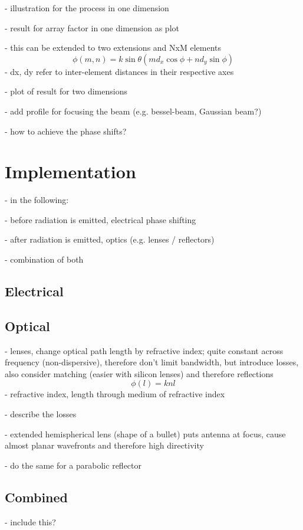 \documentclass[]{report}
\begin{document}
- illustration for the process in one dimension

- result for array factor in one dimension as plot

- this can be extended to two extensions and NxM elements
\begin{equation}
	\phi(m,n) = k\sin\theta(md_x\cos\phi + nd_y\sin\phi)
\end{equation}
- dx, dy refer to inter-element distances in their respective axes

- plot of result for two dimensions

- add profile for focusing the beam (e.g. bessel-beam, Gaussian beam?)

- how to achieve the phase shifts?

\section{Implementation}

- in the following:

- before radiation is emitted, electrical phase shifting

- after radiation is emitted, optics (e.g. lenses / reflectors)

- combination of both

\subsection{Electrical}

\subsection{Optical}

- lenses, change optical path length by refractive index; quite constant across frequency (non-dispersive), therefore don't limit bandwidth, but introduce losses, also consider matching (easier with silicon lenses) and therefore reflections
\begin{equation}
	\phi(l) = knl
\end{equation}
- refractive index, length through medium of refractive index

- describe the losses

- extended hemispherical lens (shape of a bullet) puts antenna at focus, cause almost planar wavefronts and therefore high directivity

- do the same for a parabolic reflector

\subsection{Combined}

- include this?
\end{document}
